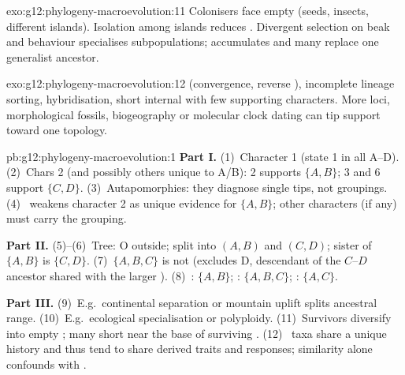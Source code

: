 \begin{solution}{exo:g12:phylogeny-macroevolution:11}
Colonisers face empty  (seeds, insects, different islands).
Isolation among islands reduces . Divergent selection on beak
and behaviour specialises subpopulations; 
accumulates and many  replace one generalist ancestor.
\end{solution}

\begin{solution}{exo:g12:phylogeny-macroevolution:12}
 (convergence, reverse ), incomplete lineage sorting,
hybridisation, short internal  with few supporting characters.
More loci, morphological fossils, biogeography or molecular clock
dating can tip support toward one topology.
\end{solution}

\begin{solution}{pb:g12:phylogeny-macroevolution:1}
\textbf{Part I.} (1)~Character 1 (state 1 in all A--D). (2)~Chars 2 (and
possibly others unique to A/B): 2 supports $\{A,B\}$; 3 and 6 support
$\{C,D\}$. (3)~Autapomorphies: they diagnose single tips, not groupings.
(4)~ weakens character 2 as unique evidence for $\{A,B\}$;
other characters (if any) must carry the grouping.

\textbf{Part II.} (5)--(6)~Tree: O outside; split into $(A,B)$ and
$(C,D)$; sister of $\{A,B\}$ is $\{C,D\}$. (7)~$\{A,B,C\}$ is not
 (excludes D, descendant of the $C$--$D$ ancestor shared with
the larger ). (8)~: $\{A,B\}$; :
$\{A,B,C\}$; : $\{A,C\}$.

\textbf{Part III.} (9)~E.g.\ continental separation or mountain uplift
splits ancestral range. (10)~E.g.\ ecological specialisation or
polyploidy. (11)~Survivors diversify into empty ; many short
 near the base of surviving . (12)~ taxa share
a unique history and thus tend to share derived traits and responses;
similarity alone confounds  with .
\end{solution}
